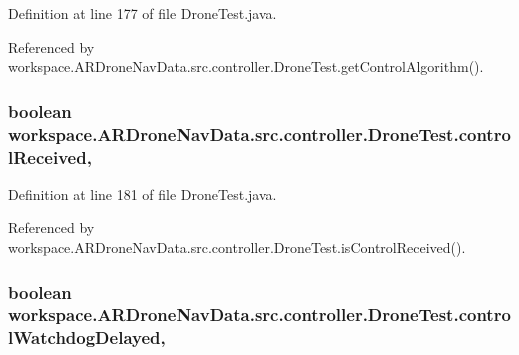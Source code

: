 Definition at line 177 of file Drone\+Test.\+java.



Referenced by workspace.\+A\+R\+Drone\+Nav\+Data.\+src.\+controller.\+Drone\+Test.\+get\+Control\+Algorithm().

\hypertarget{classworkspace_1_1_a_r_drone_nav_data_1_1src_1_1controller_1_1_drone_test_a4314f49b3a2ceab3ed1467c7200377c5}{}
\subsubsection[{control\+Received}]{\setlength{\rightskip}{0pt plus 5cm}boolean workspace.\+A\+R\+Drone\+Nav\+Data.\+src.\+controller.\+Drone\+Test.\+control\+Received\hspace{0.3cm}{\ttfamily [static]}, {\ttfamily [protected]}}\label{classworkspace_1_1_a_r_drone_nav_data_1_1src_1_1controller_1_1_drone_test_a4314f49b3a2ceab3ed1467c7200377c5}


Definition at line 181 of file Drone\+Test.\+java.



Referenced by workspace.\+A\+R\+Drone\+Nav\+Data.\+src.\+controller.\+Drone\+Test.\+is\+Control\+Received().

\hypertarget{classworkspace_1_1_a_r_drone_nav_data_1_1src_1_1controller_1_1_drone_test_a3fc085b3e7c6a774c3404f5713dfe893}{}
\subsubsection[{control\+Watchdog\+Delayed}]{\setlength{\rightskip}{0pt plus 5cm}boolean workspace.\+A\+R\+Drone\+Nav\+Data.\+src.\+controller.\+Drone\+Test.\+control\+Watchdog\+Delayed\hspace{0.3cm}{\ttfamily [static]}, {\ttfamily [protected]}}\label{classworkspace_1_1_a_r_drone_nav_data_1_1src_1_1controller_1_1_drone_test_a3fc085b3e7c6a774c3404f5713dfe893}


